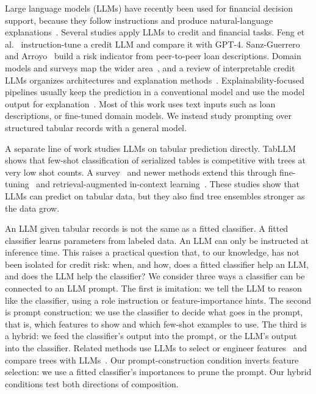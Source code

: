 \documentclass[conference]{IEEEtran}
\begin{document}
Large language models (LLMs) have recently been used for financial decision support, because they follow instructions and produce natural-language explanations~\cite{brown2020language}. Several studies apply LLMs to credit and financial tasks. Feng et al.~\cite{feng2023calm} instruction-tune a credit LLM and compare it with GPT-4. Sanz-Guerrero and Arroyo~\cite{sanzguerrero2025p2p} build a risk indicator from peer-to-peer loan descriptions. Domain models and surveys map the wider area~\cite{yang2023fingpt,li2023finance}, and a review of interpretable credit LLMs organizes architectures and explanation methods~\cite{golec2025review}. Explainability-focused pipelines usually keep the prediction in a conventional model and use the model output for explanation~\cite{nallakaruppan2024credit,bussmann2021explainable}. Most of this work uses text inputs such as loan descriptions, or fine-tuned domain models. We instead study prompting over structured tabular records with a general model.

A separate line of work studies LLMs on tabular prediction directly. TabLLM~\cite{hegselmann2023tabllm} shows that few-shot classification of serialized tables is competitive with trees at very low shot counts. A survey~\cite{fang2024survey} and newer methods extend this through fine-tuning~\cite{rabbani2025transfer} and retrieval-augmented in-context learning~\cite{wen2025scalable}. These studies show that LLMs can predict on tabular data, but they also find tree ensembles stronger as the data grow.

An LLM given tabular records is not the same as a fitted classifier. A fitted classifier learns parameters from labeled data. An LLM can only be instructed at inference time. This raises a practical question that, to our knowledge, has not been isolated for credit risk: when, and how, does a fitted classifier help an LLM, and does the LLM help the classifier? We consider three ways a classifier can be connected to an LLM prompt. The first is imitation: we tell the LLM to reason like the classifier, using a role instruction or feature-importance hints. The second is prompt construction: we use the classifier to decide what goes in the prompt, that is, which features to show and which few-shot examples to use. The third is a hybrid: we feed the classifier's output into the prompt, or the LLM's output into the classifier. Related methods use LLMs to select or engineer features~\cite{jeong2025llmselect,li2024featsel,han2024featllm} and compare trees with LLMs~\cite{huertas2024gbt}. Our prompt-construction condition inverts feature selection: we use a fitted classifier's importances to prune the prompt. Our hybrid conditions test both directions of composition.
\end{document}
